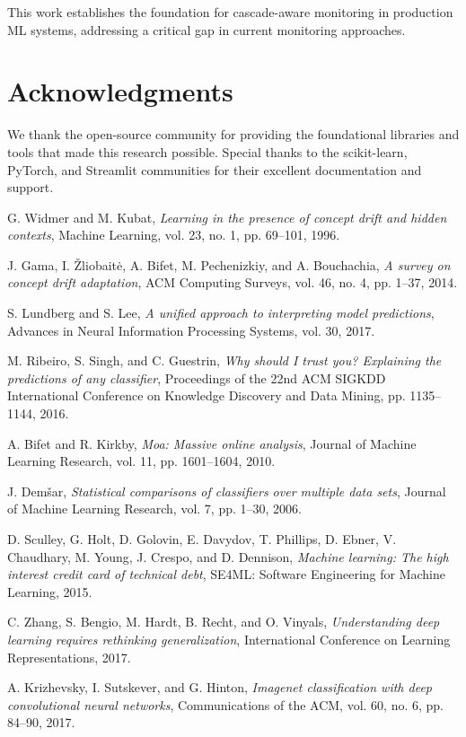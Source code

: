 \documentclass{article}
\begin{document}
This work establishes the foundation for cascade-aware monitoring in production ML systems, addressing a critical gap in current monitoring approaches.

\section*{Acknowledgments}

We thank the open-source community for providing the foundational libraries and tools that made this research possible. Special thanks to the scikit-learn, PyTorch, and Streamlit communities for their excellent documentation and support.


\begin{thebibliography}{9}

G. Widmer and M. Kubat,
\textit{Learning in the presence of concept drift and hidden contexts},
Machine Learning, vol. 23, no. 1, pp. 69--101, 1996.

J. Gama, I. Žliobaitė, A. Bifet, M. Pechenizkiy, and A. Bouchachia,
\textit{A survey on concept drift adaptation},
ACM Computing Surveys, vol. 46, no. 4, pp. 1--37, 2014.

S. Lundberg and S. Lee,
\textit{A unified approach to interpreting model predictions},
Advances in Neural Information Processing Systems, vol. 30, 2017.

M. Ribeiro, S. Singh, and C. Guestrin,
\textit{Why should I trust you? Explaining the predictions of any classifier},
Proceedings of the 22nd ACM SIGKDD International Conference on Knowledge Discovery and Data Mining, pp. 1135--1144, 2016.

A. Bifet and R. Kirkby,
\textit{Moa: Massive online analysis},
Journal of Machine Learning Research, vol. 11, pp. 1601--1604, 2010.

J. Demšar,
\textit{Statistical comparisons of classifiers over multiple data sets},
Journal of Machine Learning Research, vol. 7, pp. 1--30, 2006.

D. Sculley, G. Holt, D. Golovin, E. Davydov, T. Phillips, D. Ebner, V. Chaudhary, M. Young, J. Crespo, and D. Dennison,
\textit{Machine learning: The high interest credit card of technical debt},
SE4ML: Software Engineering for Machine Learning, 2015.

C. Zhang, S. Bengio, M. Hardt, B. Recht, and O. Vinyals,
\textit{Understanding deep learning requires rethinking generalization},
International Conference on Learning Representations, 2017.

A. Krizhevsky, I. Sutskever, and G. Hinton,
\textit{Imagenet classification with deep convolutional neural networks},
Communications of the ACM, vol. 60, no. 6, pp. 84--90, 2017.

\end{thebibliography}
\end{document}
